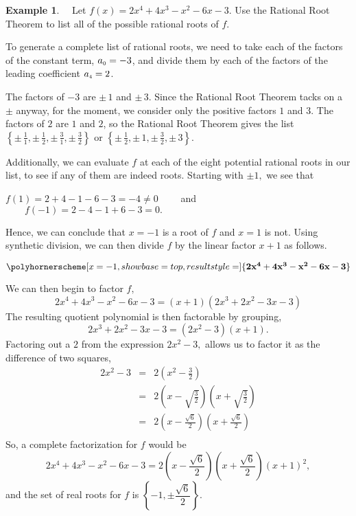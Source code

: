 \documentclass[12pt]{book}
\theoremstyle{definition}
\newtheorem{example}{Example}
\begin{document}
\begin{example}~~Let $f(x) = 2x^4+4x^3-x^2-6x-3$. Use the Rational Root Theorem to list all of the possible rational roots of $f$.\par
To generate a complete list of rational roots, we need to take each of the factors of the constant term, $a_{\mbox{\tiny$0$}} = -3$, and divide them by each of the factors of the leading coefficient $a_{\mbox{\tiny$4$}} = 2$.\par
The factors of $-3$ are $\pm \, 1$ and $\pm \, 3$.  Since the Rational Root Theorem tacks on a $\pm$ anyway, for the moment, we consider only the positive factors $1$ and $3$.  The factors of $2$ are  $1$ and $2$, so the Rational Root Theorem gives the list $\left\{\pm \, \frac{1}{1}, \pm \, \frac{1}{2},  \pm \, \frac{3}{1}, \pm \, \frac{3}{2}\right\}$ or $\left\{\pm \, \frac{1}{2}, \pm \, 1, \pm \, \frac{3}{2}, \pm \, 3\right\}$.\par
Additionally, we can evaluate $f$ at each of the eight potential rational roots in our list, to see if any of them are indeed roots.  Starting with $\pm 1,$ we see that 
\begin{center}
$f(1)=2+4-1-6-3=-4\neq 0\qquad$ and $\qquad f(-1)=2-4-1+6-3=0.$
\end{center}
\begin{multicols}{2}
Hence, we can conclude that $x=-1$ is a root of $f$ and $x=1$ is not.  Using synthetic division, we can then divide $f$ by the linear factor $x+1$ as follows.
\columnbreak
\begin{center}
$\polyhornerscheme[x=-1,showbase=top,resultstyle=\bf]{2x^4+4x^3-x^2-6x-3}$
\end{center}
\end{multicols}
We can then begin to factor $f,$
$$2x^4+4x^3-x^2-6x-3=(x+1)(2x^3+2x^2-3x-3)$$
The resulting quotient polynomial is then factorable by grouping,
$$2x^3+2x^2-3x-3=(2x^2-3)(x+1).$$
Factoring out a $2$ from the expression $2x^2-3,$ allows us to factor it as the difference of two squares,
\begin{eqnarray*}
2x^2-3 & = & 2\left(x^2-\frac{3}{2}\right)\\
& = & 2\left(x-\sqrt{\frac{3}{2}}\right)\left(x+\sqrt{\frac{3}{2}}\right)\\
& = & 2\left(x-\frac{\sqrt{6}}{2}\right)\left(x+\frac{\sqrt{6}}{2}\right)\\
\end{eqnarray*}
So, a complete factorization for $f$ would be
$$2x^4+4x^3-x^2-6x-3=2\left(x-\frac{\sqrt{6}}{2}\right)\left(x+\frac{\sqrt{6}}{2}\right)\left(x+1\right)^2,$$
and the set of real roots for $f$ is $\left\{-1,\pm\dfrac{\sqrt{6}}{2}\right\}$.
\end{example}
\end{document}
